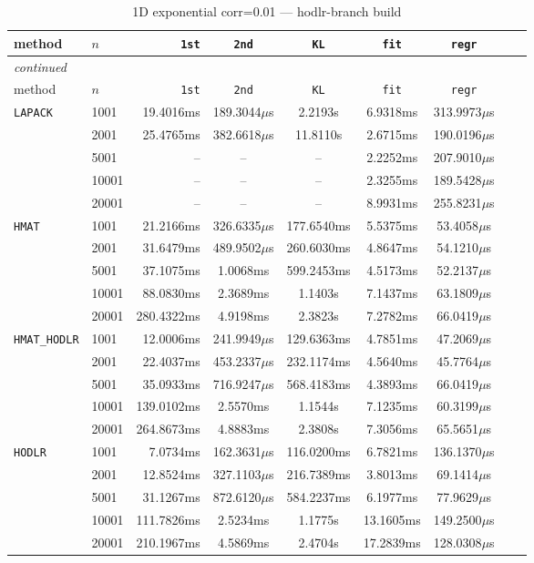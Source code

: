 \documentclass[11pt,a4paper]{article}
\begin{document}
\begin{center}
\begin{longtable}{llrcccccc}
\caption{1D exponential corr=0.01 --- hodlr-branch build}
\\\toprule
method & $n$ & \texttt{1st} & \texttt{2nd} & \texttt{KL} & \texttt{fit} & \texttt{regr}\\
\midrule
\endfirsthead
\multicolumn{8}{l}{\small\emph{continued}}\\
\toprule
method & $n$ & \texttt{1st} & \texttt{2nd} & \texttt{KL} & \texttt{fit} & \texttt{regr}\\
\midrule
\endhead

\texttt{LAPACK} & 1001 & 19.4016ms & 189.3044$\mu$s & 2.2193s & 6.9318ms & 313.9973$\mu$s\\
 & 2001 & 25.4765ms & 382.6618$\mu$s & 11.8110s & 2.6715ms & 190.0196$\mu$s\\
 & 5001 & -- & -- & -- & 2.2252ms & 207.9010$\mu$s\\
 & 10001 & -- & -- & -- & 2.3255ms & 189.5428$\mu$s\\
 & 20001 & -- & -- & -- & 8.9931ms & 255.8231$\mu$s\\
\texttt{HMAT} & 1001 & 21.2166ms & 326.6335$\mu$s & 177.6540ms & 5.5375ms & 53.4058$\mu$s\\
 & 2001 & 31.6479ms & 489.9502$\mu$s & 260.6030ms & 4.8647ms & 54.1210$\mu$s\\
 & 5001 & 37.1075ms & 1.0068ms & 599.2453ms & 4.5173ms & 52.2137$\mu$s\\
 & 10001 & 88.0830ms & 2.3689ms & 1.1403s & 7.1437ms & 63.1809$\mu$s\\
 & 20001 & 280.4322ms & 4.9198ms & 2.3823s & 7.2782ms & 66.0419$\mu$s\\
\texttt{HMAT\_HODLR} & 1001 & 12.0006ms & 241.9949$\mu$s & 129.6363ms & 4.7851ms & 47.2069$\mu$s\\
 & 2001 & 22.4037ms & 453.2337$\mu$s & 232.1174ms & 4.5640ms & 45.7764$\mu$s\\
 & 5001 & 35.0933ms & 716.9247$\mu$s & 568.4183ms & 4.3893ms & 66.0419$\mu$s\\
 & 10001 & 139.0102ms & 2.5570ms & 1.1544s & 7.1235ms & 60.3199$\mu$s\\
 & 20001 & 264.8673ms & 4.8883ms & 2.3808s & 7.3056ms & 65.5651$\mu$s\\
\texttt{HODLR} & 1001 & 7.0734ms & 162.3631$\mu$s & 116.0200ms & 6.7821ms & 136.1370$\mu$s\\
 & 2001 & 12.8524ms & 327.1103$\mu$s & 216.7389ms & 3.8013ms & 69.1414$\mu$s\\
 & 5001 & 31.1267ms & 872.6120$\mu$s & 584.2237ms & 6.1977ms & 77.9629$\mu$s\\
 & 10001 & 111.7826ms & 2.5234ms & 1.1775s & 13.1605ms & 149.2500$\mu$s\\
 & 20001 & 210.1967ms & 4.5869ms & 2.4704s & 17.2839ms & 128.0308$\mu$s\\
\bottomrule\end{longtable}\end{center}
\end{document}
